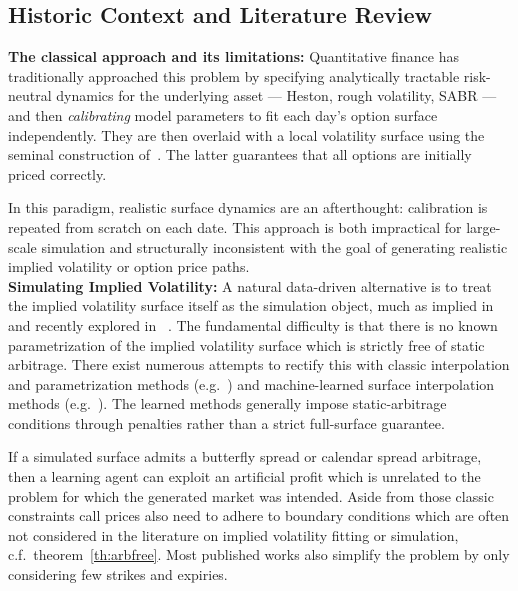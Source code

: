 \documentclass[11pt,a4paper]{article}
\begin{document}
\subsection*{Historic Context and Literature Review}

\noindent
\textbf{The classical approach and its limitations:}
Quantitative finance has traditionally approached this problem by specifying
analytically tractable risk-neutral dynamics for the underlying asset ---
Heston, rough volatility, SABR --- and then \emph{calibrating} model parameters
to fit each day's option surface independently. They are then overlaid with 
a local volatility surface using the seminal construction of~\citet{Guyon2011TheSC}. The latter
guarantees that all options are initially priced correctly.

In this paradigm, realistic surface dynamics are an afterthought: calibration is repeated
from scratch on each date. 
This approach is both impractical for large-scale simulation and structurally inconsistent
with the goal of generating realistic implied volatility or option price
paths.\\

\noindent
\textbf{Simulating Implied Volatility:}
A natural data-driven alternative is to treat the implied volatility surface itself
as the simulation object, much as implied in~\citet{ContVol} and recently explored in
~\cite{ContVuletic2023,ChoudharyJaimungalBergeron2024,HanEtAl2026}.
The fundamental difficulty is that there is no known parametrization  of
the implied volatility surface which is strictly free of static
arbitrage. There exist numerous attempts to rectify this with classic
interpolation and parametrization methods
(e.g.~\citealp{Kahale2004,fengler2009,GatheralJacquier2014,GuoJacquierMartiniNeufcourt2016,Orosi2015})
and machine-learned surface interpolation methods
(e.g.~\citealp{AckererTagasovskaVatter2020,YangChenShuHospedales2025,GononJacquierWiedemann2025}).
The learned methods generally impose static-arbitrage conditions through
penalties rather than a strict full-surface guarantee.

If a simulated surface admits a butterfly spread or calendar spread arbitrage,
then a learning agent can exploit an artificial profit which is unrelated to the
problem for which the generated market was intended. Aside from those classic constraints
call prices also need to adhere to boundary conditions which are often not considered
in the literature on implied volatility fitting or simulation, c.f.~theorem~\ref{th:arbfree}.
Most published works also simplify the problem by only considering few strikes and expiries.
\end{document}
